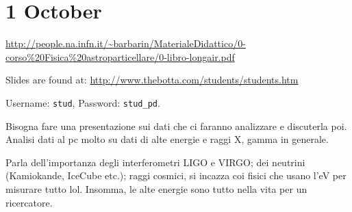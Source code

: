 \documentclass[main.tex]{subfiles}
\begin{document}
\section*{1 October}

\url{http://people.na.infn.it/~barbarin/MaterialeDidattico/0-corso%20Fisica%20astroparticellare/0-libro-longair.pdf}

Slides are found at:
\url{http://www.thebotta.com/students/students.htm}

Username: \texttt{stud}, Password: \texttt{stud\_pd}.

Bisogna fare una presentazione sui dati che ci faranno analizzare e discuterla poi. Analisi dati al pc molto su dati di alte energie e raggi X, gamma in generale.

Parla dell'importanza degli interferometri LIGO e VIRGO; dei neutrini (Kamiokande, IceCube etc.); raggi cosmici, si incazza coi fisici che usano l'eV per misurare tutto lol. Insomma, le alte energie sono tutto nella vita per un ricercatore.
\end{document}

